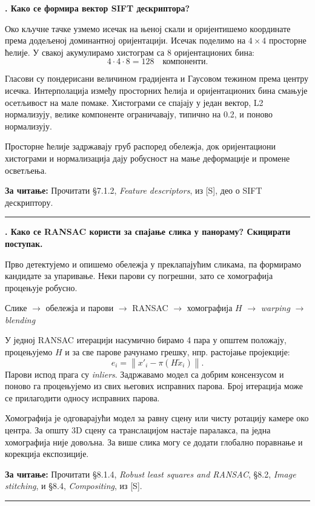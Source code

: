 \documentclass[10pt,a4paper]{article}
\newcommand{\en}[1]{\textit{#1}}
\newcounter{pitanje}
\newenvironment{odgovor}[1]{\stepcounter{pitanje}\begin{minipage}[t][0.455\textheight][t]{\textwidth}\vspace{0pt}\textbf{\thepitanje. #1}\par\smallskip}{\end{minipage}\par\ifodd\value{pitanje}\vspace{0.025\textheight}\hrule\vspace{0.015\textheight}\else\newpage\fi}
\newcommand{\izvor}[1]{\par\vfill{\footnotesize\textbf{За читање:} #1}\par}
\newcommand{\lanac}[1]{\begin{center}\small #1\end{center}}
\begin{document}
\begin{odgovor}{Како се формира вектор SIFT дескриптора?}
Око кључне тачке узмемо исечак на њеној скали и оријентишемо координате према додељеној доминантној оријентацији. Исечак поделимо на $4\times4$ просторне ћелије. У свакој акумулирамо хистограм са 8 оријентационих бина:
\[
4\cdot4\cdot8=128\quad\text{компоненти}.
\]
\begin{center}\end{center}
Гласови су пондерисани величином градијента и Гаусовом тежином према центру исечка. Интерполација између просторних ћелија и оријентационих бина смањује осетљивост на мале помаке. Хистограми се спајају у један вектор, L2 нормализују, велике компоненте ограничавају, типично на 0.2, и поново нормализују.

Просторне ћелије задржавају груб распоред обележја, док оријентациони хистограми и нормализација дају робусност на мање деформације и промене осветљења.
\izvor{Прочитати §7.1.2, \en{Feature descriptors}, из [S], део о SIFT дескриптору.}
\end{odgovor}

\begin{odgovor}{Како се RANSAC користи за спајање слика у панораму? Скицирати поступак.}
Прво детектујемо и опишемо обележја у преклапајућим сликама, па формирамо кандидате за упаривање. Неки парови су погрешни, зато се хомографија процењује робусно.
\lanac{Слике $\to$ обележја и парови $\to$ RANSAC $\to$ хомографија $H$ $\to$ \en{warping} $\to$ \en{blending}}
У једној RANSAC итерацији насумично бирамо 4 пара у општем положају, процењујемо $H$ и за све парове рачунамо грешку, нпр. растојање пројекције:
\[
e_i=\left\|x'_i-\pi(H\widetilde x_i)\right\|.
\]
Парови испод прага су \en{inliers}. Задржавамо модел са добрим консензусом и поново га процењујемо из свих његових исправних парова. Број итерација може се прилагодити односу исправних парова.

Хомографија је одговарајући модел за равну сцену или чисту ротацију камере око центра. За општу 3D сцену са транслацијом настаје паралакса, па једна хомографија није довољна. За више слика могу се додати глобално поравнање и корекција експозиције.
\izvor{Прочитати §8.1.4, \en{Robust least squares and RANSAC}, §8.2, \en{Image stitching}, и §8.4, \en{Compositing}, из [S].}
\end{odgovor}
\end{document}

